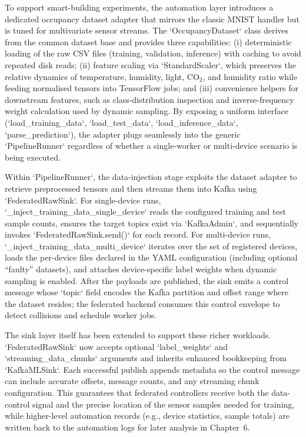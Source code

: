 To support smart-building experiments, the automation layer introduces a dedicated occupancy dataset adapter that mirrors the classic MNIST handler but is tuned for multivariate sensor streams. The `OccupancyDataset` class derives from the common dataset base and provides three capabilities: (i) deterministic loading of the raw CSV files (training, validation, inference) with caching to avoid repeated disk reads; (ii) feature scaling via `StandardScaler`, which preserves the relative dynamics of temperature, humidity, light, CO$_2$, and humidity ratio while feeding normalised tensors into TensorFlow jobs; and (iii) convenience helpers for downstream features, such as class-distribution inspection and inverse-frequency weight calculation used by dynamic sampling. By exposing a uniform interface (`load_training_data`, `load_test_data`, `load_inference_data`, `parse_prediction`), the adapter plugs seamlessly into the generic `PipelineRunner` regardless of whether a single-worker or multi-device scenario is being executed.

Within `PipelineRunner`, the data-injection stage exploits the dataset adapter to retrieve preprocessed tensors and then streams them into Kafka using `FederatedRawSink`. For single-device runs, `_inject_training_data_single_device` reads the configured training and test sample counts, ensures the target topics exist via `KafkaAdmin`, and sequentially invokes `FederatedRawSink.send()` for each record. For multi-device runs, `_inject_training_data_multi_device` iterates over the set of registered devices, loads the per-device files declared in the YAML configuration (including optional ``faulty'' datasets), and attaches device-specific label weights when dynamic sampling is enabled. After the payloads are published, the sink emits a control message whose `topic` field encodes the Kafka partition and offset range where the dataset resides; the federated backend consumes this control envelope to detect collisions and schedule worker jobs.

The sink layer itself has been extended to support these richer workloads. `FederatedRawSink` now accepts optional `label_weights` and `streaming_data_chunks` arguments and inherits enhanced bookkeeping from `KafkaMLSink`. Each successful publish appends metadata so the control message can include accurate offsets, message counts, and any streaming chunk configuration. This guarantees that federated controllers receive both the data-control signal and the precise location of the sensor samples needed for training, while higher-level automation records (e.g., device statistics, sample totals) are written back to the automation logs for later analysis in Chapter~6.

